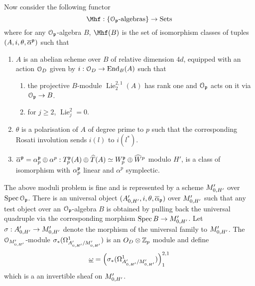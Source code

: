 \documentclass{amsart}
\newcommand{\ov}[1]{\overline{#1}}
\numberwithin{equation}{section}
\def \mb{\mbox}
\DeclareMathOperator{\Spec}{\mathrm{Spec}}
\DeclareMathOperator{\Lie}{\mathrm{Lie}}
\newcommand{\End}{\mathrm{End}}
\begin{document}
Now consider the following functor
$$\Mhf: \{\Ou_\gp\mb{-algebras}\} \map \mb{Sets}$$
where for any $\mathcal{O}_{\mathfrak{p}}$-algebra $B$,  $\Mhf(B)$ is the set of isomorphism 
classes of tuples $(A,i, \theta, \ov{\alpha}^\gp)$ such that 

\begin{enumerate}
\item $A$ is an abelian scheme over $B$ of relative dimension $4d$, equipped 
with an action $\mathcal{O}_D$ given by $i: \Ou_D \map \End_B(A)$ such that

\begin{enumerate}
\item the projective $B$-module $\Lie_2^{2,1}(A)$ has rank one and $\mathcal{O}_{\mathfrak{p}}$ 
acts on it via $\mathcal{O}_{\mathfrak{p}} \rightarrow B$.

\item for $j \geq 2$, $\Lie_j^2=0$.

\end{enumerate}

\item $\theta$ is a polarisation of $A$ of degree prime to $p$ such that the 
corresponding Rosati involution sends $i(l)$ to $i(l^*)$.

\item $\ov{\alpha}^\gp = \alpha_p^\gp \oplus \alpha^p: T_p^\gp(A) \oplus
\ohat{T}(A) \simeq W_p^\gp \oplus \ohat{W}^p$ modulo $H'$, is a class of 
isomorphism with $\alpha_p^{\mathfrak{p}}$ linear and $\alpha^p$ symplectic.
\end{enumerate}

The above moduli problem is fine and is represented by a scheme $M'_{0,H'}$ over
$\Spec \Ou_\gp$. There is an universal object 
$(A'_{0,H'},i,  \theta , \ov{\alpha}_{\gp})$ over $M'_{0,H'}$
such that any test object over an $\mathcal{O}_{\mathfrak{p}}$-algebra $B$ is obtained by pulling 
back the universal quadruple via
the corresponding morphism $\Spec B \rightarrow \Mh$. Let 
$\sigma: A'_{0,H'} \rightarrow M'_{0,H'}$
denote the morphism of the universal family to $M'_{0,H'}$. The $\mathcal{O}_{M'_{0,H'}}$-module 
$\sigma_*(\Omega^1_{A'_{0,H'} / M'_{0,H'}})$ is
an $O_D \otimes \mathbb{Z}_p$ module and define
\begin{align}
\label{uomega}
\underline{\omega}=
\left(\sigma_*(\Omega^1_{A'_{0,H'} / M'_{0,H'}})\right)_1^{2,1}
\end{align}
which is a an invertible sheaf 
on $M'_{0,H'}$. 
\end{document}
